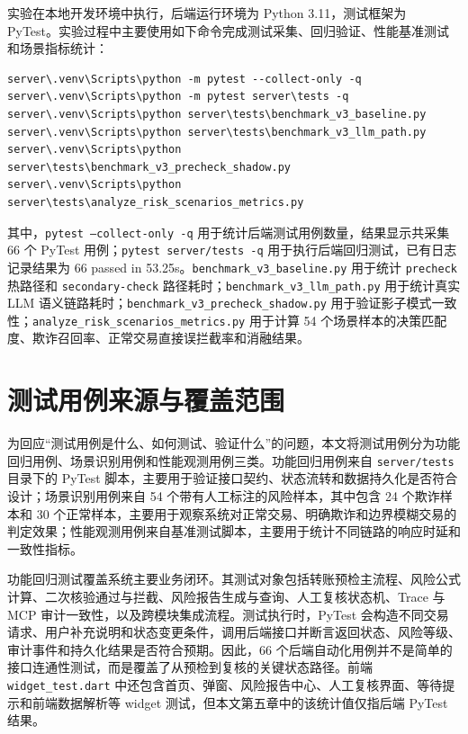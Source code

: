 \documentclass{xduugthesis}
\begin{document}
实验在本地开发环境中执行，后端运行环境为 Python 3.11，测试框架为 PyTest。实验过程中主要使用如下命令完成测试采集、回归验证、性能基准测试和场景指标统计：

\begin{verbatim}
server\.venv\Scripts\python -m pytest --collect-only -q
server\.venv\Scripts\python -m pytest server\tests -q
server\.venv\Scripts\python server\tests\benchmark_v3_baseline.py
server\.venv\Scripts\python server\tests\benchmark_v3_llm_path.py
server\.venv\Scripts\python server\tests\benchmark_v3_precheck_shadow.py
server\.venv\Scripts\python server\tests\analyze_risk_scenarios_metrics.py
\end{verbatim}

其中，\texttt{pytest --collect-only -q} 用于统计后端测试用例数量，结果显示共采集 66 个 PyTest 用例；\texttt{pytest server/tests -q} 用于执行后端回归测试，已有日志记录结果为 66 passed in 53.25s。\texttt{benchmark\_v3\_baseline.py} 用于统计 \texttt{precheck} 热路径和 \texttt{secondary-check} 路径耗时；\texttt{benchmark\_v3\_llm\_path.py} 用于统计真实 LLM 语义链路耗时；\texttt{benchmark\_v3\_precheck\_shadow.py} 用于验证影子模式一致性；\texttt{analyze\_risk\_scenarios\_metrics.py} 用于计算 54 个场景样本的决策匹配度、欺诈召回率、正常交易直接误拦截率和消融结果。

\section{测试用例来源与覆盖范围}

为回应“测试用例是什么、如何测试、验证什么”的问题，本文将测试用例分为功能回归用例、场景识别用例和性能观测用例三类。功能回归用例来自 \texttt{server/tests} 目录下的 PyTest 脚本，主要用于验证接口契约、状态流转和数据持久化是否符合设计；场景识别用例来自 54 个带有人工标注的风险样本，其中包含 24 个欺诈样本和 30 个正常样本，主要用于观察系统对正常交易、明确欺诈和边界模糊交易的判定效果；性能观测用例来自基准测试脚本，主要用于统计不同链路的响应时延和一致性指标。

功能回归测试覆盖系统主要业务闭环。其测试对象包括转账预检主流程、风险公式计算、二次核验通过与拦截、风险报告生成与查询、人工复核状态机、Trace 与 MCP 审计一致性，以及跨模块集成流程。测试执行时，PyTest 会构造不同交易请求、用户补充说明和状态变更条件，调用后端接口并断言返回状态、风险等级、审计事件和持久化结果是否符合预期。因此，66 个后端自动化用例并不是简单的接口连通性测试，而是覆盖了从预检到复核的关键状态路径。前端 \texttt{widget\_test.dart} 中还包含首页、弹窗、风险报告中心、人工复核界面、等待提示和前端数据解析等 widget 测试，但本文第五章中的该统计值仅指后端 PyTest 结果。
\end{document}
